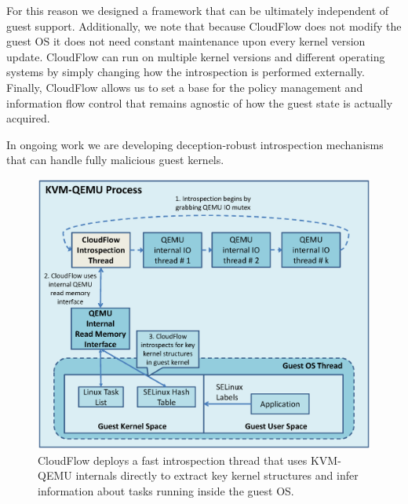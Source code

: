 For this reason we designed a framework that can be ultimately independent
of guest support.  Additionally, we note that because CloudFlow does not modify the guest OS it does not need constant maintenance upon every kernel version update. CloudFlow can run on multiple kernel versions and different operating systems by simply changing how the introspection is performed externally. Finally, CloudFlow allows us to set a base for the policy
management and information flow control that remains agnostic of how the
guest state is actually acquired.

In ongoing work we are developing deception-robust introspection mechanisms that can
handle fully malicious guest kernels.

\begin{figure}[t]
\begin{center}
\includegraphics[scale=0.3]{figures/introspectionmodule2.eps}
\caption{\small 
%
CloudFlow deploys a fast introspection thread that uses KVM-QEMU internals
directly to extract key kernel structures and infer information about tasks
running inside the guest OS.
%
\label{clowdflow:figure:introspectionmodule}}
\end{center}
\end{figure}

